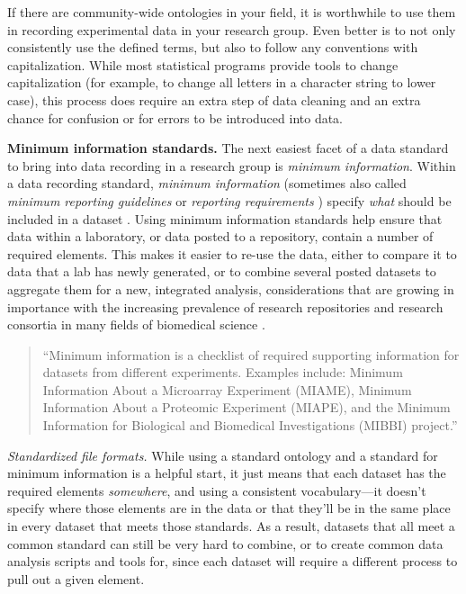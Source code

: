 \documentclass[]{tufte-book}
\begin{document}
If there are community-wide ontologies in your field, it is worthwhile to use
them in recording experimental data in your research group. Even better is to
not only consistently use the defined terms, but also to follow any conventions
with capitalization. While most statistical programs provide tools to change
capitalization (for example, to change all letters in a character string to
lower case), this process does require an extra step of data cleaning and an
extra chance for confusion or for errors to be introduced into data.

\textbf{Minimum information standards.} The next easiest facet of a data standard to
bring into data recording in a research group is \emph{minimum information}. Within a
data recording standard, \emph{minimum information} (sometimes also called \emph{minimum
reporting guidelines} \citep{sansone2012toward} or \emph{reporting requirements}
\citep{brazma2006standards}) specify \emph{what} should be included in a dataset
\citep{ghosh2011software}. Using minimum information standards help ensure that data
within a laboratory, or data posted to a repository, contain a number of
required elements. This makes it easier to re-use the data, either to compare it
to data that a lab has newly generated, or to combine several posted datasets to
aggregate them for a new, integrated analysis, considerations that are growing
in importance with the increasing prevalence of research repositories and
research consortia in many fields of biomedical science \citep{keller2017evolution}.

\begin{quote}
``Minimum information is a checklist of required supporting information for
datasets from different experiments. Examples include: Minimum Information About
a Microarray Experiment (MIAME), Minimum Information About a Proteomic
Experiment (MIAPE), and the Minimum Information for Biological and Biomedical
Investigations (MIBBI) project.'' \citep{ghosh2011software}
\end{quote}

\emph{Standardized file formats.} While using a standard ontology and a standard for
minimum information is a helpful start, it just means that each dataset has the
required elements \emph{somewhere}, and using a consistent vocabulary---it doesn't
specify where those elements are in the data or that they'll be in the same
place in every dataset that meets those standards. As a result, datasets that all
meet a common standard can still be very hard to combine, or to create common
data analysis scripts and tools for, since each dataset will require a different
process to pull out a given element.
\end{document}
